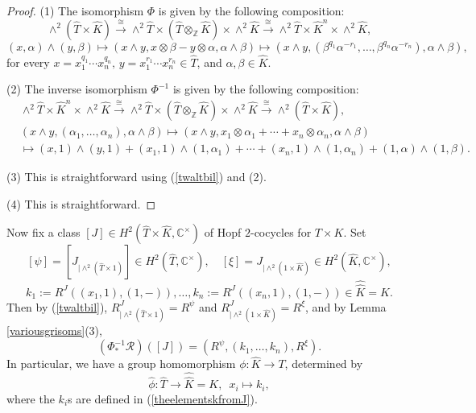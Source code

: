 \documentclass{amsart}
\theoremstyle{definition}
\newcommand{\ot}{\otimes}
\numberwithin{equation}{section}
\begin{document}
\begin{proof}
(1) The isomorphism $\Phi$ is given by the following composition:
$$\wedge^2(\widehat{T}\times \widehat{K})\xrightarrow{\cong}\wedge^2\widehat{T}\times (\widehat{T}\ot_{\mathbb{Z}} \widehat{K})\times \wedge^2\widehat{K}\xrightarrow{\cong}\wedge^2\widehat{T}\times \widehat{K}^n\times \wedge^2\widehat{K},$$
$$(x,\alpha)\wedge (y,\beta)\mapsto (x\wedge y,x\ot\beta -y\ot\alpha,\alpha\wedge\beta)\mapsto (x\wedge y,(\beta^{q_1}\alpha^{-r_1},\dots,\beta^{q_n}\alpha^{-r_n}),\alpha\wedge\beta),$$
for every $x=x_1^{q_1}\cdots x_n^{q_n},\,y=x_1^{r_1}\cdots x_n^{r_n}\in \widehat{T}$, and 
$\alpha,\beta\in \widehat{K}$.

(2) The inverse isomorphism $\Phi^{-1}$ is given by the following composition:
\begin{equation*}
\begin{split}
& \wedge^2\widehat{T}\times \widehat{K}^n\times \wedge^2\widehat{K}\xrightarrow{\cong}\wedge^2\widehat{T}\times (\widehat{T}\ot_{\mathbb{Z}} \widehat{K})\times \wedge^2\widehat{K}\xrightarrow{\cong}\wedge^2(\widehat{T}\times \widehat{K}),\\
&(x\wedge y,(\alpha_1,\dots,\alpha_n),\alpha\wedge\beta)\mapsto (x\wedge y,x_1\ot \alpha_1+\cdots +x_n\ot \alpha_n,\alpha\wedge\beta)\\
&\mapsto (x,1)\wedge (y,1)+(x_1,1)\wedge (1,\alpha_1)+\cdots +(x_n,1)\wedge (1,\alpha_n)+(1,\alpha)\wedge(1,\beta).
\end{split}
\end{equation*}

(3) This is straightforward using (\ref{twaltbil}) and (2).

(4) This is straightforward.
\end{proof}

Now fix a class $[J]\in H^2(\widehat{T}\times\widehat{K},\mathbb{C}^{\times})$ of Hopf $2$-cocycles for $T\times K$. 
Set 
\begin{equation}\label{theelementskfromJ0}
[\psi]=[J_{\mid \wedge^2(\widehat{T}\times 1)}]\in H^2(\widehat{T},\mathbb{C}^{\times}),\quad [\xi]=J_{\mid \wedge^2(1\times \widehat{K})}\in H^2(\widehat{K},\mathbb{C}^{\times}),
\end{equation} 
\begin{equation}\label{theelementskfromJ}
k_1:=R^J\left((x_1,1),(1,-)\right),\dots,k_n:=R^J\left((x_n,1),(1,-)\right)\in \widehat{\widehat{K}}=K.
\end{equation}
Then by (\ref{twaltbil}), $R^J_{\mid \wedge^2(\widehat{T}\times 1)}=R^{\psi}$ and $R^J_{\mid \wedge^2(1\times \widehat{K})}=R^{\xi}$,
and by Lemma \ref{variousgrisoms}(3), 
$$(\Phi^{-1}_*\mathscr{R})([J])=(R^{\psi},(k_1,\dots,k_n),R^{\xi}).$$  
In particular, we have a group homomorphism $\phi:\widehat{K}\to T$, determined by  
\begin{equation}\label{theelementtheta}
\widehat{\phi}:\widehat{T}\to \widehat{\widehat{K}}=K,\,\,\,x_i\mapsto k_i,
\end{equation}
where the $k_i$s are defined in (\ref{theelementskfromJ}). 
\end{document}
